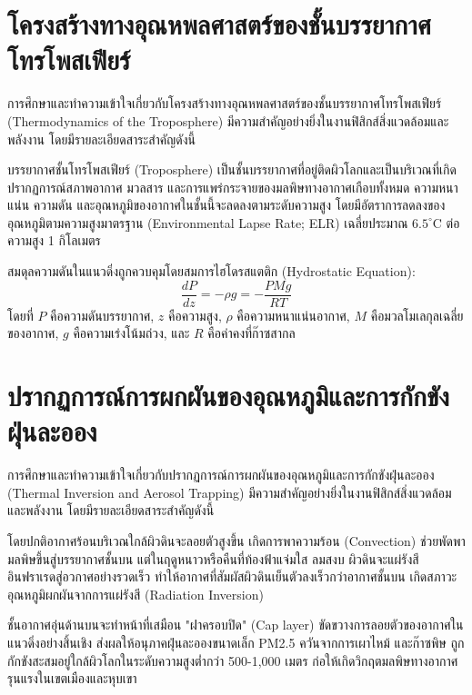 
\section{โครงสร้างทางอุณหพลศาสตร์ของชั้นบรรยากาศโทรโพสเฟียร์}

การศึกษาและทำความเข้าใจเกี่ยวกับโครงสร้างทางอุณหพลศาสตร์ของชั้นบรรยากาศโทรโพสเฟียร์ (Thermodynamics of the Troposphere) มีความสำคัญอย่างยิ่งในงานฟิสิกส์สิ่งแวดล้อมและพลังงาน โดยมีรายละเอียดสาระสำคัญดังนี้

บรรยากาศชั้นโทรโพสเฟียร์ (Troposphere) เป็นชั้นบรรยากาศที่อยู่ติดผิวโลกและเป็นบริเวณที่เกิดปรากฏการณ์สภาพอากาศ มวลสาร และการแพร่กระจายของมลพิษทางอากาศเกือบทั้งหมด ความหนาแน่น ความดัน และอุณหภูมิของอากาศในชั้นนี้จะลดลงตามระดับความสูง โดยมีอัตราการลดลงของอุณหภูมิตามความสูงมาตรฐาน (Environmental Lapse Rate; ELR) เฉลี่ยประมาณ $6.5^{\circ}$C ต่อความสูง 1 กิโลเมตร

สมดุลความดันในแนวดิ่งถูกควบคุมโดยสมการไฮโดรสแตติก (Hydrostatic Equation):
\[ \frac{dP}{dz} = -\rho g = -\frac{PMg}{RT} \]
โดยที่ $P$ คือความดันบรรยากาศ, $z$ คือความสูง, $\rho$ คือความหนาแน่นอากาศ, $M$ คือมวลโมเลกุลเฉลี่ยของอากาศ, $g$ คือความเร่งโน้มถ่วง, และ $R$ คือค่าคงที่ก๊าซสากล

\section{ปรากฏการณ์การผกผันของอุณหภูมิและการกักขังฝุ่นละออง}

การศึกษาและทำความเข้าใจเกี่ยวกับปรากฏการณ์การผกผันของอุณหภูมิและการกักขังฝุ่นละออง (Thermal Inversion and Aerosol Trapping) มีความสำคัญอย่างยิ่งในงานฟิสิกส์สิ่งแวดล้อมและพลังงาน โดยมีรายละเอียดสาระสำคัญดังนี้

โดยปกติอากาศร้อนบริเวณใกล้ผิวดินจะลอยตัวสูงขึ้น เกิดการพาความร้อน (Convection) ช่วยพัดพามลพิษขึ้นสู่บรรยากาศชั้นบน แต่ในฤดูหนาวหรือคืนที่ท้องฟ้าแจ่มใส ลมสงบ ผิวดินจะแผ่รังสีอินฟราเรดสู่อวกาศอย่างรวดเร็ว ทำให้อากาศที่สัมผัสผิวดินเย็นตัวลงเร็วกว่าอากาศชั้นบน เกิดสภาวะ อุณหภูมิผกผันจากการแผ่รังสี (Radiation Inversion)

ชั้นอากาศอุ่นด้านบนจะทำหน้าที่เสมือน "ฝาครอบปิด" (Cap layer) ขัดขวางการลอยตัวของอากาศในแนวดิ่งอย่างสิ้นเชิง ส่งผลให้อนุภาคฝุ่นละอองขนาดเล็ก PM2.5 ควันจากการเผาไหม้ และก๊าซพิษ ถูกกักขังสะสมอยู่ใกล้ผิวโลกในระดับความสูงต่ำกว่า 500-1,000 เมตร ก่อให้เกิดวิกฤตมลพิษทางอากาศรุนแรงในเขตเมืองและหุบเขา

